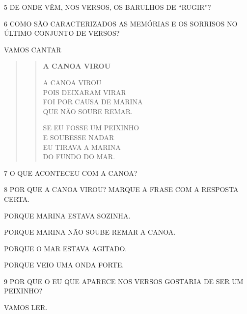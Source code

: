 \num{5} DE ONDE VÊM, NOS VERSOS, OS BARULHOS DE ``RUGIR''?


\num{6} COMO SÃO CARACTERIZADOS AS MEMÓRIAS E OS SORRISOS NO ÚLTIMO CONJUNTO DE VERSOS?


\pagebreak
VAMOS CANTAR

\begin{quote}
\begin{verse}
\textbf{A CANOA VIROU}

A CANOA VIROU\\
POIS DEIXARAM VIRAR\\
FOI POR CAUSA DE MARINA\\
QUE NÃO SOUBE REMAR.

SE EU FOSSE UM PEIXINHO\\
E SOUBESSE NADAR\\
EU TIRAVA A MARINA\\
DO FUNDO DO MAR.
\end{verse}

\end{quote}

\num{7} O QUE ACONTECEU COM A CANOA?



\num{8} POR QUE A CANOA VIROU? MARQUE A FRASE COM A RESPOSTA CERTA.

\begin{boxlist}
 PORQUE MARINA ESTAVA SOZINHA.

 PORQUE MARINA NÃO SOUBE REMAR A CANOA.

 PORQUE O MAR ESTAVA AGITADO.

 PORQUE VEIO UMA ONDA FORTE.
\end{boxlist}

\num{9} POR QUE O EU QUE APARECE NOS VERSOS GOSTARIA DE SER UM PEIXINHO?


\pagebreak

VAMOS LER.

